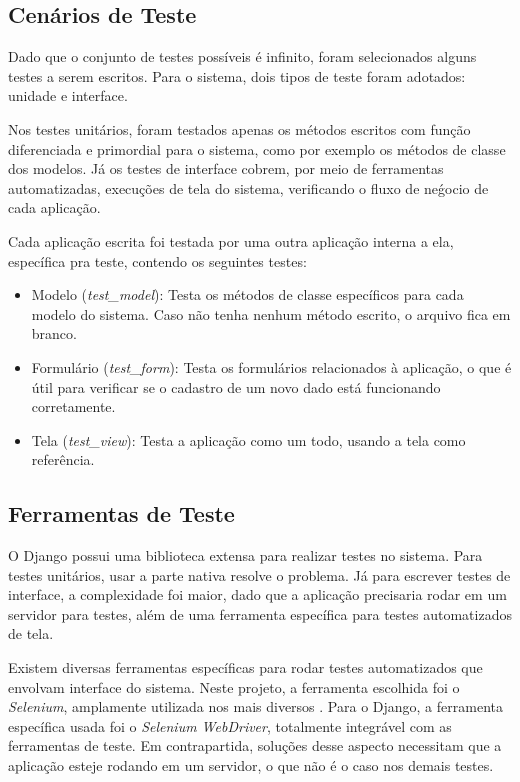 \subsection{Cenários de Teste}
Dado que o conjunto de testes possíveis é infinito, foram selecionados alguns testes a serem escritos. Para o sistema, dois tipos de teste foram adotados: unidade e interface. 

Nos testes unitários, foram testados apenas os métodos escritos com função diferenciada e primordial para o sistema, como por exemplo os métodos de classe dos modelos. Já os testes de interface cobrem, por meio de ferramentas automatizadas, execuções de tela do sistema, verificando o fluxo de neǵocio de cada aplicação.

Cada aplicação escrita foi testada por uma outra aplicação interna a ela, específica pra teste, contendo os seguintes testes:

\begin{itemize}
    \item Modelo (\textit{test\_model}): Testa os métodos de classe específicos para cada modelo do sistema. Caso não tenha nenhum método escrito, o arquivo fica em branco.
    \item Formulário (\textit{test\_form}): Testa os formulários relacionados à aplicação, o que é útil para verificar se o cadastro de um novo dado está funcionando corretamente.
    \item Tela (\textit{test\_view}): Testa a aplicação como um todo, usando a tela como referência.
\end{itemize}

\subsection{Ferramentas de Teste}
O Django possui uma biblioteca extensa para realizar testes no sistema. Para testes unitários, usar a parte nativa resolve o problema. Já para escrever testes de interface, a complexidade foi maior, dado que a aplicação precisaria rodar em um servidor para testes, além de uma ferramenta específica para testes automatizados de tela.

Existem diversas ferramentas específicas para rodar testes automatizados que envolvam interface do sistema. Neste projeto, a ferramenta escolhida foi o \textit{Selenium}\cite{selenium2018}, amplamente utilizada nos mais diversos . Para o Django, a ferramenta específica usada foi o \textit{Selenium WebDriver}, totalmente integrável com as ferramentas de teste. Em contrapartida, soluções desse aspecto necessitam que a aplicação esteje rodando em um servidor, o que não é o caso nos demais testes.

